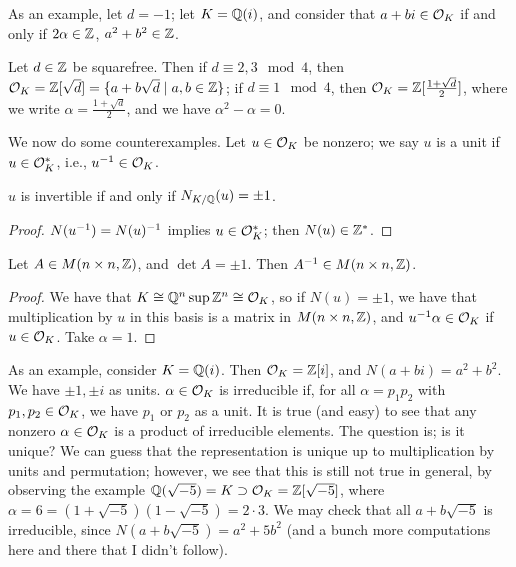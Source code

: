 \noindent As an example, let $d = -1$; let $K = \mathbb Q(i)$, and consider that $a + bi \in \mathcal O_K$ if and only if $2\alpha \in \mathbb Z$, $a^2 + b^2 \in \mathbb Z$.
\begin{lemma}
    Let $d \in \mathbb Z$ be squarefree. Then if $d \equiv 2, 3 \mod 4$, then $\mathcal O_K = \mathbb Z[\sqrt{d}] = \{a + b\sqrt{d} \mid a, b \in \mathbb Z\}$; if $d \equiv 1 \mod 4$, then $\mathcal O_K = \mathbb Z[\frac{1 + \sqrt{d}}{2}]$, where we write $\alpha = \frac{1+\sqrt{d}}{2}$, and we have $\alpha^2 - \alpha = 0$.
\end{lemma}
\noindent We now do some counterexamples. Let $u \in \mathcal O_K$ be nonzero; we say $u$ is a unit if $u \in \mathcal O_K^\ast$, i.e., $u^{-1} \in \mathcal O_K$.
\begin{lemma}
    $u$ is invertible if and only if $N_{K/\mathbb Q}(u) = \pm 1$.
\end{lemma}
\begin{proof}
    $N(u^{-1}) = N(u)^{-1}$ implies $u \in \mathcal O_K^\ast$; then $N(u) \in \mathbb Z^\ast$. 
\end{proof}
\begin{claim}
    Let $A \in M(n \times n, \mathbb Z)$, and $\det A = \pm 1$. Then $A^{-1} \in M(n \times n, \mathbb Z)$.
\end{claim}
\begin{proof}
    We have that $K \cong \mathbb Q^n \sup \mathbb Z^n \cong \mathcal O_K$, so if $N(u) = \pm 1$, we have that multiplication by $u$ in this basis is a matrix in $M(n \times n, \mathbb Z)$, and $u^{-1} \alpha \in \mathcal O_K$ if $u \in \mathcal O_K$. Take $\alpha = 1$.
\end{proof}
\noindent As an example, consider $K = \mathbb Q(i)$. Then $\mathcal O_K = \mathbb Z[i]$, and $N(a + bi) = a^2 + b^2$. We have $\pm 1, \pm i$ as units. $\alpha \in \mathcal O_K$ is irreducible if, for all $\alpha = p_1 p_2$ with $p_1, p_2 \in \mathcal O_K$, we have $p_1$ or $p_2$ as a unit. It is true (and easy) to see that any nonzero $\alpha \in \mathcal O_K$ is a product of irreducible elements. The question is; is it unique? We can guess that the representation is unique up to multiplication by units and permutation; however, we see that this is still not true in general, by observing the example $\mathbb Q(\sqrt{-5}) = K \supset \mathcal O_K = \mathbb Z[\sqrt{-5}]$, where $\alpha = 6 = (1 + \sqrt{-5})(1 - \sqrt{-5}) = 2 \cdot 3$. We may check that all $a + b \sqrt{-5}$ is irreducible, since $N(a + b\sqrt{-5}) = a^2 + 5b^2$ (and a bunch more computations here and there that I didn't follow).